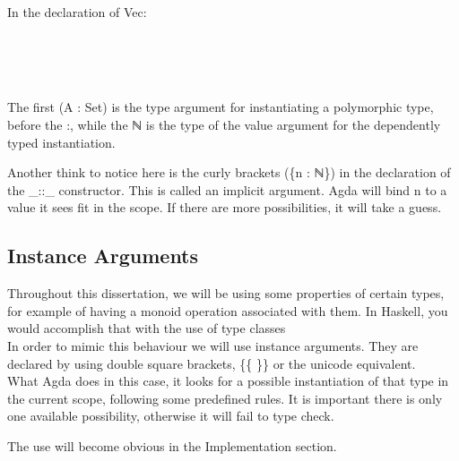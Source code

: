 \documentclass[12pt,twoside,notitlepage]{report}
\begin{document}
  In the declaration of Vec: \\

\begin{code}
\>  \AgdaSymbol{(} \AgdaSymbol{:} \AgdaSymbol{)} \AgdaSymbol{:}    \<%
\\
\>[0]\<[2]%
\>[2]\AgdaInductiveConstructor{[]} \<[6]%
\>[6]\AgdaSymbol{:}   \<%
\\
\>[0]\<[2]%
\>[2] \AgdaSymbol{:}  \AgdaSymbol{\{}\AgdaSymbol{\}}          \AgdaSymbol{(} \AgdaSymbol{)} \<[45]%
\>[45]\<%
\end{code}\\

  The first (A : Set) is the type argument for instantiating a polymorphic type, before the :, while the ℕ is the type of the value argument for
  the dependently typed instantiation.

  Another think to notice here is the curly brackets (\{n : ℕ\}) in the declaration of the \_::\_ constructor.
  This is called an implicit argument. Agda will bind n to a value it sees fit in the scope. If there are more possibilities, it will take a guess.

\subsection{Instance Arguments}

  Throughout this dissertation, we will be using some properties of certain types, for example of having a monoid operation associated with them.
  In Haskell, you would accomplish that with the use of type classes \cite{typeclasses} \\
  In order to mimic this behaviour we will use instance arguments. They are declared by using double square brackets, \{\{ \}\} or the unicode
  equivalent. \\
  What Agda does in this case, it looks for a possible instantiation of that type in the current scope, following some predefined rules. \cite{instanceargs}
  It is important there is only one available possibility, otherwise it will fail to type check.

  The use will become obvious in the Implementation section.
\end{document}
